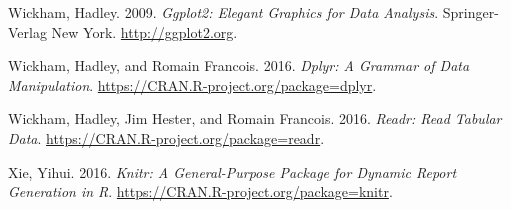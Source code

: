 \documentclass[]{article}
\begin{document}
\hypertarget{ref-ggplot2}{}
Wickham, Hadley. 2009. \emph{Ggplot2: Elegant Graphics for Data
Analysis}. Springer-Verlag New York. \url{http://ggplot2.org}.

\hypertarget{ref-dplyr}{}
Wickham, Hadley, and Romain Francois. 2016. \emph{Dplyr: A Grammar of
Data Manipulation}. \url{https://CRAN.R-project.org/package=dplyr}.

\hypertarget{ref-readr}{}
Wickham, Hadley, Jim Hester, and Romain Francois. 2016. \emph{Readr:
Read Tabular Data}. \url{https://CRAN.R-project.org/package=readr}.

\hypertarget{ref-knitr}{}
Xie, Yihui. 2016. \emph{Knitr: A General-Purpose Package for Dynamic
Report Generation in R}. \url{https://CRAN.R-project.org/package=knitr}.
\end{document}
